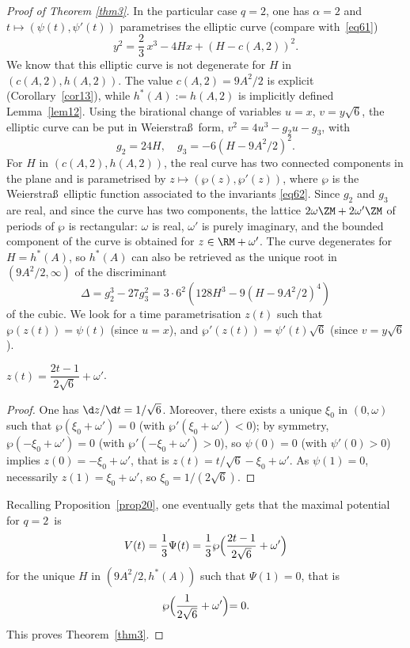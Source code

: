 \begin{proof}[Proof of Theorem \ref{thm3}]
In the particular case $q=2$, one has $\alpha=2$ and $t \mapsto (\psi(t),\psi'(t))$
parametrises the elliptic curve (compare with~\eqref{eq61})
\[
y^2 = \frac{2}{3}\,x^3-4Hx+(H-c(A,2))^2.
\]
We know that this elliptic curve is not degenerate for $H$ in
$(c(A,2),h(A,2))$. The value $c(A,2)=9A^2/2$ is explicit (Corollary~\ref{cor13}),
while $h^*(A):=h(A,2)$ is implicitly defined Lemma~\ref{lem12}.
Using the birational change of variables $u=x$, $v=y\sqrt{6}$, the elliptic curve can
be put in Weierstra\ss\ form, $v^2 = 4u^3-g_2 u-g_3$, with
\begin{equation} \label{eq62}
g_2 = 24 H,\quad g_3 = -6(H-9A^2/2)^2.
\end{equation}
For $H$ in $(c(A,2),h(A,2))$, the real curve has two connected components in the plane
and is
parametrised by $z \mapsto (\wp(z),\wp'(z))$, where $\wp$ is the Weierstra\ss\
elliptic function associated to the invariants \eqref{eq62}. Since $g_2$ and $g_3$ are
real, and since the curve has two components, the lattice $2\omega\ZM+2\omega'\ZM$
of periods of $\wp$ is rectangular: $\omega$ is real, $\omega'$ is purely imaginary,
and the bounded component of the curve is obtained for $z \in \RM+\omega'$. The curve
degenerates for $H=h^*(A)$, so $h^*(A)$ can also be retrieved as the unique root in
$(9A^2/2,\infty)$ of the discriminant
\[
\Delta = g_2^3-27g_3^2 = 3\cdot 6^2(128 H^3-9(H-9A^2/2)^4)
\]
of the cubic. We look for a time parametrisation $z(t)$ such that
$\wp(z(t))=\psi(t)$ (since $u=x$), and $\wp'(z(t))=\psi'(t)\sqrt{6}$ (since
$v=y\sqrt{6}$).

\begin{lemma} $z(t) = \dfrac{2t-1}{2\sqrt{6}}+\omega'$.
\end{lemma}

\begin{proof} One has $\d z/\d t=1/\sqrt{6}$.
Moreover, there exists a unique $\xi_0$ in $(0,\omega)$ such that
$\wp(\xi_0+\omega')=0$ (with $\wp'(\xi_0+\omega')<0$); by symmetry,
$\wp(-\xi_0+\omega')=0$ (with $\wp'(-\xi_0+\omega')>0$), so $\psi(0)=0$ (with
$\psi'(0)>0$) implies $z(0)=-\xi_0+\omega'$, that is $z(t)=t/\sqrt{6}-\xi_0+\omega'$.
As $\psi(1)=0$, necessarily $z(1)=\xi_0+\omega'$, so $\xi_0=1/(2\sqrt{6})$.
\end{proof}

Recalling Proposition~\ref{prop20}, one eventually gets that the maximal potential
for $q=2$~is
\[
V(t) = \frac{1}{3}\Psi(t) = \frac{1}{3}\wp\Bigl(\frac{2t-1}{2\sqrt{6}}+\omega'\Bigl)
\]
for the unique $H$ in $(9A^2/2,h^*(A))$ such that $\Psi(1)=0$, that is
\[
\wp\Bigl(\frac{1}{2\sqrt{6}}+\omega'\Bigl) = 0.
\]
This proves Theorem~\ref{thm3}.
\end{proof}

